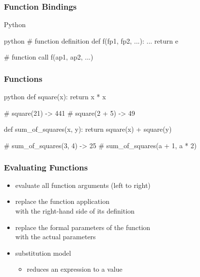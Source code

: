 \documentclass[dvipsnames]{beamer}
\theoremstyle{plain}
\begin{document}
\begin{frame}[fragile]
  \frametitle{Function Bindings}

  \begin{block}{Python}
    \begin{pygments}{python}
# function definition
def f(fp1, fp2, ...):
    ...
    return e

# function call
f(ap1, ap2, ...)
    \end{pygments}
  \end{block}
\end{frame}

\begin{frame}[fragile]
  \frametitle{Functions}

  \begin{example}[Python]
    \begin{pygments}{python}
def square(x):
    return x * x

# square(21) -> 441
# square(2 + 5) -> 49

def sum_of_squares(x, y):
    return square(x) + square(y)

# sum_of_squares(3, 4) -> 25
# sum_of_squares(a + 1, a * 2)
    \end{pygments}
  \end{example}
\end{frame}

\begin{frame}
  \frametitle{Evaluating Functions}

  \begin{itemize}
    \item evaluate all function arguments (left to right)
    \item replace the function application\\
      with the right-hand side of its definition
    \item replace the formal parameters of the function\\
      with the actual parameters

    \pause
    \bigskip
    \item \alert{substitution model}
    \begin{itemize}
      \item reduces an expression to a value
    \end{itemize}
  \end{itemize}
\end{frame}
\end{document}
